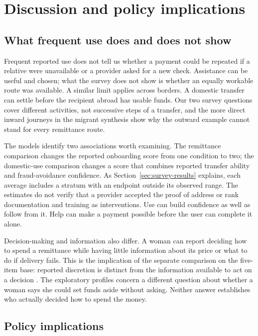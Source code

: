 \section{Discussion and policy implications}


\subsection{What frequent use does and does not show}

Frequent reported use does not tell us whether a payment could be repeated if a relative were unavailable or a provider asked for a new check. Assistance can be useful and chosen; what the survey does not show is whether an equally workable route was available. A similar limit applies across borders. A domestic transfer can settle before the recipient abroad has usable funds. Our two survey questions cover different activities, not successive steps of a transfer, and the more direct inward journeys in the migrant synthesis show why the outward example cannot stand for every remittance route.

The models identify two associations worth examining. The remittance comparison changes the reported onboarding score from one condition to two; the domestic-use comparison changes a score that combines reported transfer ability and fraud-avoidance confidence. As Section~\ref{sec:survey-results} explains, each average includes a stratum with an endpoint outside its observed range. The estimates do not verify that a provider accepted the proof of address or rank documentation and training as interventions. Use can build confidence as well as follow from it. Help can make a payment possible before the user can complete it alone.

Decision-making and information also differ. A woman can report deciding how to spend a remittance while having little information about its price or what to do if delivery fails. This is the implication of the separate comparison on the five-item base: reported discretion is distinct from the information available to act on a decision \citep{kabeer1999}. The exploratory profiles concern a different question about whether a woman says she could set funds aside without asking. Neither answer establishes who actually decided how to spend the money.

\subsection{Policy implications}

